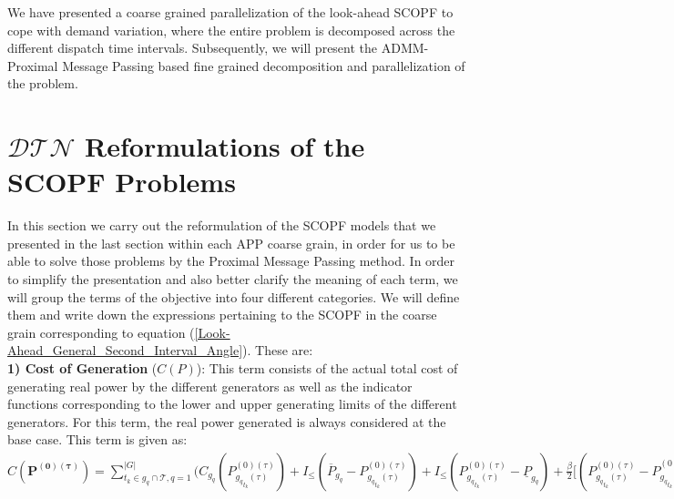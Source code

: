 \documentclass[preprint,12pt,3p]{elsarticle}
\begin{document}
We have presented a coarse grained parallelization of the look-ahead SCOPF to cope with demand variation, where the entire problem is decomposed across the different dispatch time intervals. Subsequently, we will present the ADMM-Proximal Message Passing based fine grained decomposition and parallelization of the problem.
\section{$\mathcal{DTN}$ Reformulations of the SCOPF Problems}
\label{DTNFormulation}
In this section we carry out the reformulation of the SCOPF models that we presented in the last section within each APP coarse grain, in order for us to be able to solve those problems by the Proximal Message Passing method. In order to simplify the presentation and also better clarify the meaning of each term, we will group the terms of the objective into four different categories. We will define them and write down the expressions pertaining to the SCOPF in the coarse grain corresponding to equation (\ref{Look-Ahead_General_Second_Interval_Angle}). These are:\\
\textbf{1) Cost of Generation} ($C(P)$): This term consists of the actual total cost of generating real power by the different generators as well as the indicator functions corresponding to the lower and upper generating limits of the different generators. For this term, the real power generated is always considered at the base case. This term is given as:\\
$C(\mathbf{P^{(0)(\tau)}})=\sum_{t_k\in g_q\cap{\mathcal{T}}, q=1}^{|G|}\bigg(C_{g_q}({P}_{{g_q}_{t_k}(\tau)}^{(0)(\tau)})+I_{\leq}(\overline{P}_{g_q}-{P}_{{g_q}_{t_k}(\tau)}^{(0)(\tau)})
+I_{\leq}({P}_{{g_q}_{t_k}(\tau)}^{(0)(\tau)}-\underline{P}_{g_q})+\frac{\beta}{2}\bigg[({P}_{{g_q}_{t_k}(\tau)}^{(0)(\tau)}-{P}_{{g_q}_{t_k}(\tau)}^{(0)(\tau)(\mu_{APP})})^2+\sum_{s=-1,1}({P}_{{g_q}_{t_k}(\tau)}^{(0)(\tau+s)}-{P}_{{g_q}_{t_k}(\tau)}^{(0)(\tau+s)(\mu_{APP})})^2\bigg]+\gamma\bigg[\sum_{s=-1,1}({P}_{{g_q}_{t_k}(\tau)}^{(0)(\tau)}({P}_{{g_q}_{t_k}(\tau)}^{(0)(\tau)(\mu_{APP})}-{P}_{{g_q}_{t_k}(0)(\tau+s)}^{(0)(\tau)(\mu_{APP})})+{P}_{{g_q}_{t_k}(\tau)}^{(0)(\tau+s)}({P}_{{g_q}_{t_k}(\tau)}^{(0)(\tau+s)(\mu_{APP})}-{P}_{{g_q}_{t_k}(0)(\tau+s)}^{(0)(\tau+s)(\mu_{APP})}))\bigg]+(\lambda_{{g_q}2(\tau-1)}^{(\mu_{APP})}-\lambda_{{g_q}(2\tau-2)}^{(\mu_{APP})}){P}_{{g_q}_{t_k}(\tau)}^{(0)(\tau)}+\lambda_{{g_q}(2\tau)}^{(\mu_{APP})}{P}_{{g_q}_{t_k}(\tau)}^{(0)(\tau+1)}-\lambda_{{g_q}(2\tau-3)}^{(\mu_{APP})}{P}_{{g_q}_{t_k}(\tau)}^{(0)(\tau-1)}\bigg)$\\
\end{document}
